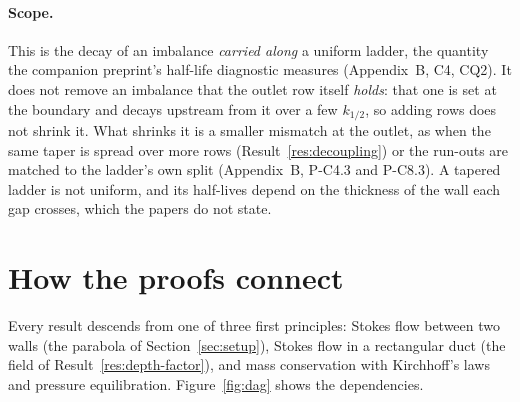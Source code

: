 \paragraph{Scope.} This is the decay of an imbalance \emph{carried along} a uniform ladder, the
quantity the companion preprint's half-life diagnostic measures (Appendix~B, C4, CQ2). It does
not remove an imbalance that the outlet row itself \emph{holds}: that one is set at the boundary
and decays upstream from it over a few $k_{1/2}$, so adding rows does not shrink it. What shrinks
it is a smaller mismatch at the outlet, as when the same taper is spread over more rows
(Result~\ref{res:decoupling}) or the run-outs are matched to the ladder's own split (Appendix~B,
P-C4.3 and P-C8.3). A tapered
ladder is not uniform, and its half-lives depend on the thickness of the wall each gap crosses,
which the papers do not state.

\section{How the proofs connect}
\label{sec:connect}

Every result descends from one of three first principles: Stokes flow between two walls (the
parabola of Section~\ref{sec:setup}), Stokes flow in a rectangular duct (the field of
Result~\ref{res:depth-factor}), and mass conservation with Kirchhoff's laws and pressure
equilibration. Figure~\ref{fig:dag} shows
the dependencies.

